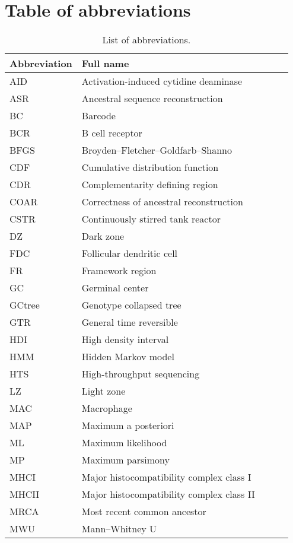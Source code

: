 \chapter{Table of abbreviations}

\begin{table}[!ht]
\begin{tabular}{l*{3}{l}r}
	 \textbf{Abbreviation} & \textbf{Full name} \\
	\hline
	AID & Activation-induced cytidine deaminase \\
	ASR & Ancestral sequence reconstruction \\
	BC & Barcode \\
	BCR & B cell receptor \\
	BFGS & Broyden–Fletcher–Goldfarb–Shanno \\
	CDF & Cumulative distribution function \\
	CDR & Complementarity defining region \\
	COAR & Correctness of ancestral reconstruction \\
	CSTR & Continuously stirred tank reactor \\
	DZ & Dark zone \\
	FDC & Follicular dendritic cell \\
	FR & Framework region \\
	GC & Germinal center \\
	GCtree & Genotype collapsed tree \\
	GTR & General time reversible \\
	HDI & High density interval \\
	HMM & Hidden Markov model \\
	HTS & High-throughput sequencing \\
    LZ & Light zone \\
	MAC & Macrophage \\
	MAP & Maximum a posteriori \\
	ML & Maximum likelihood \\
	MP & Maximum parsimony \\
	MHCI & Major histocompatibility complex class I \\
	MHCII & Major histocompatibility complex class II \\
	MRCA & Most recent common ancestor \\
	MWU & Mann–Whitney U \\
	\hline
\end{tabular}
\caption{List of abbreviations.}
\end{table}

